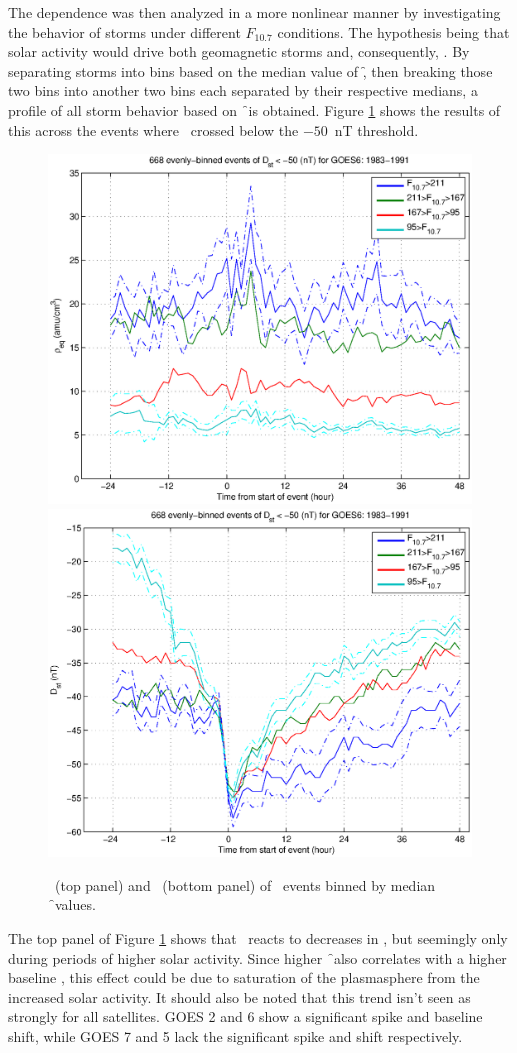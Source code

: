 The dependence was then analyzed in a more nonlinear manner by investigating the behavior of storms under different $F_{10.7}$ conditions. The hypothesis being that solar activity would drive both geomagnetic storms and, consequently, \req. By separating storms into bins based on the median value of \f, then breaking those two bins into another two bins each separated by their respective medians, a profile of all storm behavior based on \f\ is obtained. Figure \ref{fig:HighLowF107rhoeq} shows the results of this across the events where \dst\ crossed below the $-50$~nT threshold. 

\begin{figure}[htp!]
	\centering
	\includegraphics[width=0.7\linewidth]{Figures/HighLowF107rhoeq-Dst50-GOES6-1983-1991}
	\includegraphics[width=0.7\linewidth]{Figures/HighLowF107Dst-Dst50-GOES6-1983-1991}	
	\caption{\req\ (top panel) and \dst\ (bottom panel) of \dst\ events binned by median \f\ values.}
	\label{fig:HighLowF107rhoeq}
\end{figure}

The top panel of Figure \ref{fig:HighLowF107rhoeq} shows that \req\ reacts to decreases in \dst, but seemingly only during periods of higher solar activity. Since higher \f\ also correlates with a higher baseline \req, this effect could be due to saturation of the plasmasphere from the increased solar activity. It should also be noted that this trend isn't seen as strongly for all satellites. GOES 2 and 6 show a significant spike and baseline shift, while GOES 7 and 5 lack the significant spike and shift respectively. 

